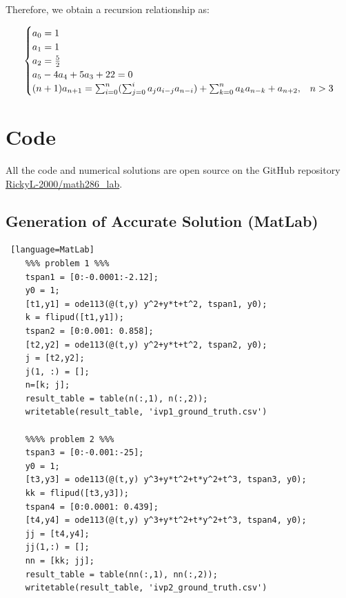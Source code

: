 \documentclass[a4paper]{article}
\begin{document}
\begin{appendices}
    Therefore, we obtain a recursion relationship as:
    
    \begin{equation}
        \begin{cases}
            a_0 = 1 \\
            a_1 = 1 \\
            a_2 = {5 \over 2} \\
            a_5 - 4a_4 + 5a_3 + 22 = 0 \\
            (n+1)a_{n+1} = \sum_{i=0}^{n}(\sum_{j=0}^{i}a_j a_{i-j} a_{n-i}) + \sum_{k=0}^{n} a_k a_{n-k} + a_{n+2}, & \text{$n > 3$} \\
        \end{cases}
    \end{equation}
    
    \clearpage
    
    \section{Code} \label{apdx:code}
    
    All the code and numerical solutions are open source on the GitHub repository \href{https://github.com/RickyL-2000/math286_lab}{RickyL-2000/math286\_lab}.
    
    \subsection{Generation of Accurate Solution (MatLab)}
    
    \begin{lstlisting} [language=MatLab]
    %%% problem 1 %%%
    tspan1 = [0:-0.0001:-2.12];
    y0 = 1;
    [t1,y1] = ode113(@(t,y) y^2+y*t+t^2, tspan1, y0);
    k = flipud([t1,y1]);
    tspan2 = [0:0.001: 0.858];
    [t2,y2] = ode113(@(t,y) y^2+y*t+t^2, tspan2, y0);
    j = [t2,y2];
    j(1, :) = [];
    n=[k; j];
    result_table = table(n(:,1), n(:,2));
    writetable(result_table, 'ivp1_ground_truth.csv')
    
    %%%% problem 2 %%%
    tspan3 = [0:-0.001:-25];
    y0 = 1;
    [t3,y3] = ode113(@(t,y) y^3+y*t^2+t*y^2+t^3, tspan3, y0);
    kk = flipud([t3,y3]);
    tspan4 = [0:0.0001: 0.439];
    [t4,y4] = ode113(@(t,y) y^3+y*t^2+t*y^2+t^3, tspan4, y0);
    jj = [t4,y4];
    jj(1,:) = [];
    nn = [kk; jj];
    result_table = table(nn(:,1), nn(:,2));
    writetable(result_table, 'ivp2_ground_truth.csv')
    
    \end{lstlisting}
    

\end{appendices}
\end{document}
